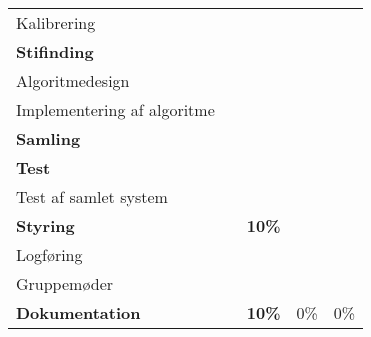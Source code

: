 \begin{footnotesize}
\begin{center}
\begin{tabular}{l | l | r r r}
	\hspace*{0.3cm}\hspace*{0.3cm} Kalibrering					&		&		& 		& \\
	\hspace*{0.3cm} \textbf{Stifinding}							&		&		& 		& \\
	\hspace*{0.3cm}\hspace*{0.3cm} Algoritmedesign				&		&		& 		& \\
	\hspace*{0.3cm}\hspace*{0.3cm} Implementering af algoritme	&		&		& 		& \\
	\hspace*{0.3cm} \textbf{Samling}							&		&		& 		& \\
	\hspace*{0.3cm} \textbf{Test}								&		&		& 		& \\
	\hspace*{0.3cm}\hspace*{0.3cm} Test af samlet system		&		&		& 		& \\
	\hline
	\textbf{Styring}											&		& \textbf{10\%}		& 		& \\
	\hspace*{0.3cm} Logføring									&		&		& 		& \\
	\hspace*{0.3cm} Gruppemøder									&		&		& 		& \\
	\hline
	\textbf{Dokumentation}										&		& \textbf{10\%}		& 0\%	& 0\%
\end{tabular}
\end{center}
\end{footnotesize}